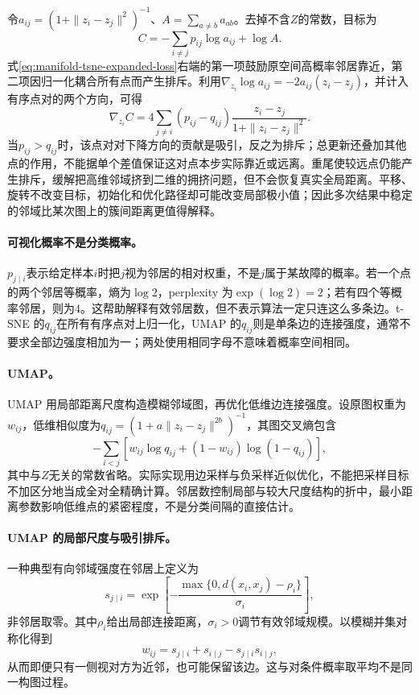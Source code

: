 令$a_{ij}=(1+\|z_i-z_j\|^2)^{-1}$、$A=\sum_{a\ne b}a_{ab}$。去掉不含$Z$的常数，目标为
\begin{equation}
 C=-\sum_{i\ne j}p_{ij}\log a_{ij}+\log A.\label{eq:manifold-tsne-expanded-loss}
\end{equation}
式\eqref{eq:manifold-tsne-expanded-loss}右端的第一项鼓励原空间高概率邻居靠近，第二项因归一化耦合所有点而产生排斥。利用$\nabla_{z_i}\log a_{ij}=-2a_{ij}(z_i-z_j)$，并计入有序点对的两个方向，可得
\begin{equation}
 \nabla_{z_i}C=4\sum_{j\ne i}(p_{ij}-q_{ij})
 \frac{z_i-z_j}{1+\|z_i-z_j\|^2}.
\end{equation}
当$p_{ij}>q_{ij}$时，该点对对下降方向的贡献是吸引，反之为排斥；总更新还叠加其他点的作用，不能据单个差值保证这对点本步实际靠近或远离。重尾使较远点仍能产生排斥，缓解把高维邻域挤到二维的拥挤问题，但不会恢复真实全局距离。平移、旋转不改变目标，初始化和优化路径却可能改变局部极小值；因此多次结果中稳定的邻域比某次图上的簇间距离更值得解释。

\paragraph{可视化概率不是分类概率。}
$p_{j\mid i}$表示给定样本$i$时把$j$视为邻居的相对权重，不是$j$属于某故障的概率。若一个点的两个邻居等概率，熵为$\log2$，perplexity 为$\exp(\log2)=2$；若有四个等概率邻居，则为$4$。这帮助解释有效邻居数，但不表示算法一定只连这么多条边。t-SNE 的$q_{ij}$在所有有序点对上归一化，UMAP 的$q_{ij}$则是单条边的连接强度，通常不要求全部边强度相加为一；两处使用相同字母不意味着概率空间相同。

\paragraph{UMAP。}
UMAP 用局部距离尺度构造模糊邻域图，再优化低维边连接强度\cite{mcinnes2018umap}。设原图权重为$w_{ij}$，低维相似度为$q_{ij}=(1+a\|z_i-z_j\|^{2b})^{-1}$，其图交叉熵包含
\begin{equation}
 -\sum_{i<j}\left[w_{ij}\log q_{ij}+(1-w_{ij})\log(1-q_{ij})\right],
\end{equation}
其中与$Z$无关的常数省略。实际实现用边采样与负采样近似优化，不能把采样目标不加区分地当成全对全精确计算。邻居数控制局部与较大尺度结构的折中，最小距离参数影响低维点的紧密程度，不是分类间隔的直接估计。

\paragraph{UMAP 的局部尺度与吸引排斥。}
一种典型有向邻域强度在邻居上定义为
\begin{equation}
 s_{j\mid i}=\exp\left[-\frac{\max\{0,d(x_i,x_j)-\rho_i\}}{\sigma_i}\right],
\end{equation}
非邻居取零。其中$\rho_i$给出局部连接距离，$\sigma_i>0$调节有效邻域规模。以模糊并集对称化得到
\begin{equation}
 w_{ij}=s_{j\mid i}+s_{i\mid j}-s_{j\mid i}s_{i\mid j},
\end{equation}
从而即便只有一侧视对方为近邻，也可能保留该边。这与对条件概率取平均不是同一构图过程。

